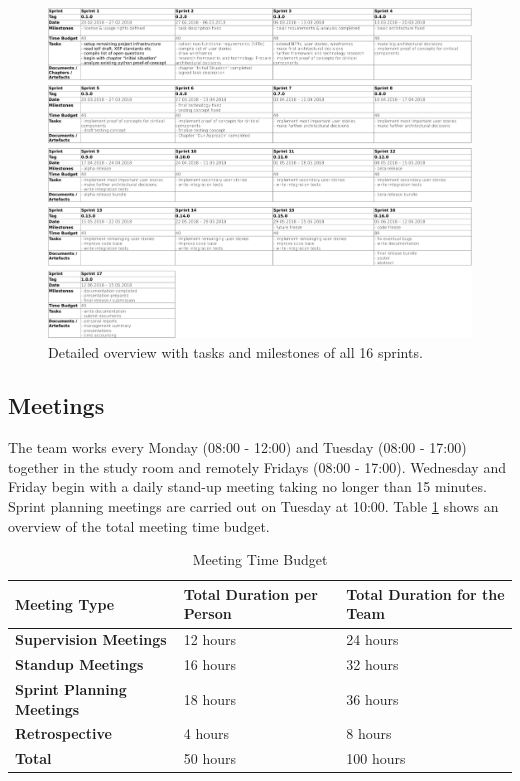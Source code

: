 \begin{figure}[h]
    \begin{sideways}
    \includegraphics[scale=0.75]{resources/sprint_details}
    \end{sideways}
    \centering
    \caption{Detailed overview with tasks and milestones of all 16 sprints.}
    \label{fig:sprint-details}
\end{figure}


\subsection{Meetings}
The team works every Monday (08:00 - 12:00) and Tuesday (08:00 - 17:00) together in the study room and remotely Fridays (08:00 - 17:00). Wednesday and Friday begin with a daily stand-up meeting taking no longer than 15 minutes. Sprint planning meetings are carried out on Tuesday at 10:00. Table \ref{meeting-time-budget} shows an overview of the total meeting time budget.

\begin{table}[]
    \centering
    \caption{Meeting Time Budget}
    \label{meeting-time-budget}
    \begin{tabular}{lll}
        \hline
        \textbf{Meeting Type}             & \textbf{Total Duration per Person} & \textbf{Total Duration for the Team} \\ \hline
        \textbf{Supervision Meetings}     & 12 hours                           & 24 hours                             \\
        \textbf{Standup Meetings}         & 16 hours                            & 32 hours                             \\
        \textbf{Sprint Planning Meetings} & 18 hours                           & 36 hours                             \\
        \textbf{Retrospective}            & 4 hours                            & 8 hours                              \\ \hline
        \textbf{Total}                    & 50 hours                           & 100 hours
    \end{tabular}
\end{table}

